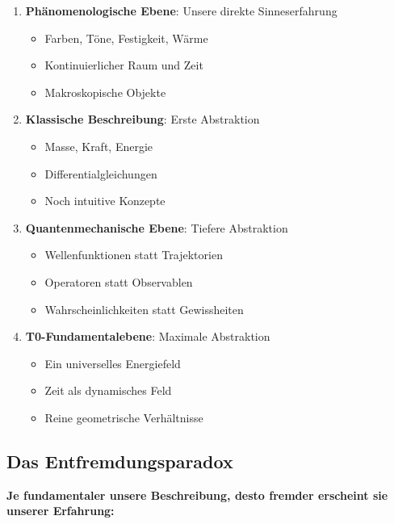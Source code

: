 \documentclass[12pt,a4paper]{article}
\begin{document}
	\begin{tcolorbox}[colback=orange!5!white,colframe=orange!75!black,title=Ontologische Schichtung der Realität]
		\begin{enumerate}
			\item \textbf{Phänomenologische Ebene}: Unsere direkte Sinneserfahrung
			\begin{itemize}
				\item Farben, Töne, Festigkeit, Wärme
				\item Kontinuierlicher Raum und Zeit
				\item Makroskopische Objekte
			\end{itemize}
			
			\item \textbf{Klassische Beschreibung}: Erste Abstraktion
			\begin{itemize}
				\item Masse, Kraft, Energie
				\item Differentialgleichungen
				\item Noch intuitive Konzepte
			\end{itemize}
			
			\item \textbf{Quantenmechanische Ebene}: Tiefere Abstraktion
			\begin{itemize}
				\item Wellenfunktionen statt Trajektorien
				\item Operatoren statt Observablen
				\item Wahrscheinlichkeiten statt Gewissheiten
			\end{itemize}
			
			\item \textbf{T0-Fundamentalebene}: Maximale Abstraktion
			\begin{itemize}
				\item Ein universelles Energiefeld
				\item Zeit als dynamisches Feld
				\item Reine geometrische Verhältnisse
			\end{itemize}
		\end{enumerate}
	\end{tcolorbox}
	
	\subsection{Das Entfremdungsparadox}
	
	\textbf{Je fundamentaler unsere Beschreibung, desto fremder erscheint sie unserer Erfahrung:}
	
\end{document}
